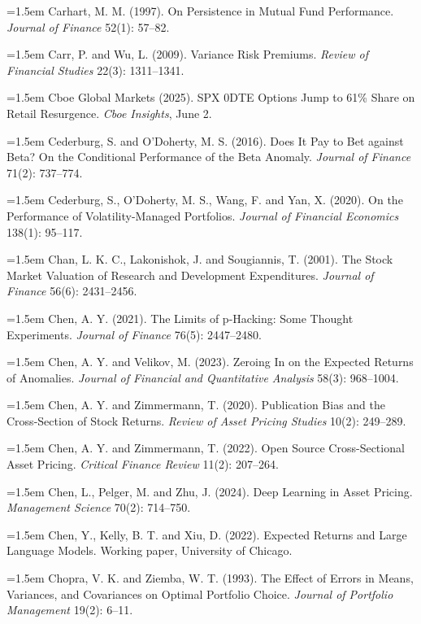 \hangindent=1.5em Carhart, M. M. (1997). On Persistence in Mutual Fund Performance. \emph{Journal of Finance} 52(1): 57--82.

\hangindent=1.5em Carr, P. and Wu, L. (2009). Variance Risk Premiums. \emph{Review of Financial Studies} 22(3): 1311--1341.

\hangindent=1.5em Cboe Global Markets (2025). SPX 0DTE Options Jump to 61\% Share on Retail Resurgence. \emph{Cboe Insights}, June 2.

\hangindent=1.5em Cederburg, S. and O'Doherty, M. S. (2016). Does It Pay to Bet against Beta? On the Conditional Performance of the Beta Anomaly. \emph{Journal of Finance} 71(2): 737--774.

\hangindent=1.5em Cederburg, S., O'Doherty, M. S., Wang, F. and Yan, X. (2020). On the Performance of Volatility-Managed Portfolios. \emph{Journal of Financial Economics} 138(1): 95--117.

\hangindent=1.5em Chan, L. K. C., Lakonishok, J. and Sougiannis, T. (2001). The Stock Market Valuation of Research and Development Expenditures. \emph{Journal of Finance} 56(6): 2431--2456.

\hangindent=1.5em Chen, A. Y. (2021). The Limits of p-Hacking: Some Thought Experiments. \emph{Journal of Finance} 76(5): 2447--2480.

\hangindent=1.5em Chen, A. Y. and Velikov, M. (2023). Zeroing In on the Expected Returns of Anomalies. \emph{Journal of Financial and Quantitative Analysis} 58(3): 968--1004.

\hangindent=1.5em Chen, A. Y. and Zimmermann, T. (2020). Publication Bias and the Cross-Section of Stock Returns. \emph{Review of Asset Pricing Studies} 10(2): 249--289.

\hangindent=1.5em Chen, A. Y. and Zimmermann, T. (2022). Open Source Cross-Sectional Asset Pricing. \emph{Critical Finance Review} 11(2): 207--264.

\hangindent=1.5em Chen, L., Pelger, M. and Zhu, J. (2024). Deep Learning in Asset Pricing. \emph{Management Science} 70(2): 714--750.

\hangindent=1.5em Chen, Y., Kelly, B. T. and Xiu, D. (2022). Expected Returns and Large Language Models. Working paper, University of Chicago.

\hangindent=1.5em Chopra, V. K. and Ziemba, W. T. (1993). The Effect of Errors in Means, Variances, and Covariances on Optimal Portfolio Choice. \emph{Journal of Portfolio Management} 19(2): 6--11.

